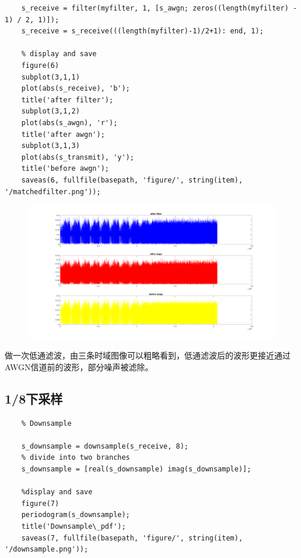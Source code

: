 \begin{spacing}{1.5}
\begin{lstlisting}
    s_receive = filter(myfilter, 1, [s_awgn; zeros((length(myfilter) - 1) / 2, 1)]);
    s_receive = s_receive(((length(myfilter)-1)/2+1): end, 1);
    
    % display and save
    figure(6)
    subplot(3,1,1)
    plot(abs(s_receive), 'b');
    title('after filter');
    subplot(3,1,2)
    plot(abs(s_awgn), 'r');
    title('after awgn');
    subplot(3,1,3)
    plot(abs(s_transmit), 'y');
    title('before awgn');
    saveas(6, fullfile(basepath, 'figure/', string(item), '/matchedfilter.png'));
\end{lstlisting}

\begin{figure}[H]
\centering
\includegraphics[width = \columnwidth]{matchedfilter.png}
\end{figure}

做一次低通滤波，由三条时域图像可以粗略看到，低通滤波后的波形更接近通过AWGN信道前的波形，部分噪声被滤除。

\subsection{1/8下采样}

\begin{lstlisting}
    % Downsample

    s_downsample = downsample(s_receive, 8);
    % divide into two branches
    s_downsample = [real(s_downsample) imag(s_downsample)];
    
    %display and save
    figure(7)
    periodogram(s_downsample);
    title('Downsample\_pdf');
    saveas(7, fullfile(basepath, 'figure/', string(item), '/downsample.png'));
\end{lstlisting}


\end{spacing}
